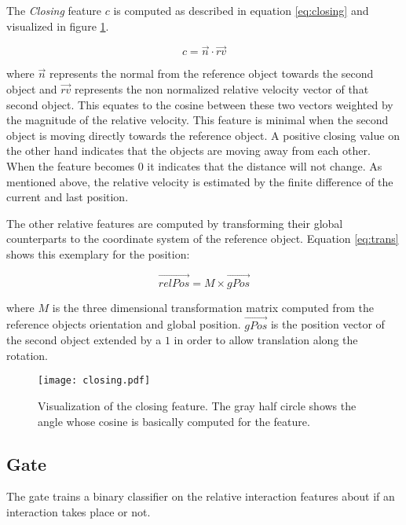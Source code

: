 The \textit{Closing} feature $c$ is computed as described in equation \ref{eq:closing} and visualized in figure \ref{fig:closing}.

\begin{equation}
  c = \vec{n} \cdot \vec{rv}
 \label{eq:closing}
\end{equation}

where $\vec{n}$ represents the normal from the reference object towards the second object and $\vec{rv}$ represents the non normalized relative velocity vector of that second object. This equates to the cosine between these two vectors weighted by the magnitude of the relative velocity. This feature is minimal when the second object is moving directly towards the reference object. A positive closing value on the other hand indicates that the objects are moving away from each other. When the feature becomes 0 it indicates that the distance will not change. As mentioned above, the relative velocity is estimated by the finite difference of the current and last position.

The other relative features are computed by transforming their global counterparts to the coordinate system of the reference object. Equation \ref{eq:trans} shows this exemplary for the position:

\begin{equation}
	\vec{relPos} = M \times \vec{gPos}
\label{eq:trans}
\end{equation}

where $M$ is the three dimensional transformation matrix computed from the reference objects orientation and global position. $\vec{gPos}$ is the position vector of the second object extended by a $1$ in order to allow translation along the rotation. 

\begin{figure}
	\centering
	\texttt{[image: closing.pdf]}
	\caption{Visualization of the closing feature. The gray half circle shows the angle whose cosine is basically computed for the feature.} 
	\label{fig:closing}
\end{figure}

\subsection{Gate}

The gate trains a binary classifier on the relative interaction features about if an interaction takes place or not. 



